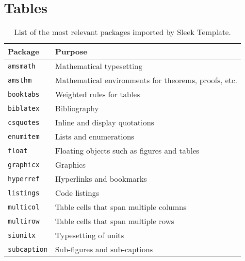 \documentclass[a4paper, 12pt]{report}
\begin{document}
    \printbibliography

    \appendix

    \chapter{Tables} \label{chap:Tables}

    \begin{table}[h]
        \centering
        \begin{tabular}{ll}
            \toprule
            \textbf{Package} & \textbf{Purpose} \\
            \midrule
            \texttt{amsmath} & Mathematical typesetting \\
            \texttt{amsthm} & Mathematical environments for theorems, proofs, etc. \\
            \texttt{booktabs} & Weighted rules for tables \\
            \texttt{biblatex} & Bibliography \\
            \texttt{csquotes} & Inline and display quotations \\
            \texttt{enumitem} & Lists and enumerations \\
            \texttt{float} & Floating objects such as figures and tables \\
            \texttt{graphicx} & Graphics \\
            \texttt{hyperref} & Hyperlinks and bookmarks \\
            \texttt{listings} & Code listings \\
            \texttt{multicol} & Table cells that span multiple columns \\
            \texttt{multirow} & Table cells that span multiple rows \\
            \texttt{siunitx} & Typesetting of units  \\
            \texttt{subcaption} & Sub-figures and sub-captions \\
            \bottomrule
        \end{tabular}
        \caption{List of the most relevant packages imported by Sleek Template.}
        \label{tab:sleek_relevant_packages}
    \end{table}
\end{document}
